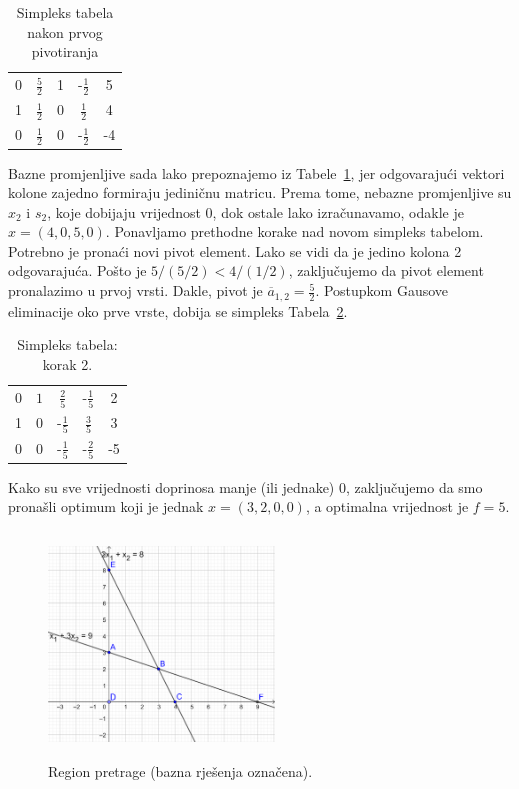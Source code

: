 \documentclass[a4paper, utf8, 11pt, colorlinks]{book}
\theoremstyle{definition}
\begin{document}
  \begin{table}[H]
     \centering
     \begin{tabular}{c c c c | c}
         0 &  $\frac{5}{2}$  & 1 & -$\frac{1}{2} $& 5 \\
         1 &  $\frac{1}{2}$ & 0 & $\frac{1}{2}$ & 4 \\ \hline
         0 &  $\frac{1}{2}$ & 0 & -$\frac{1}{2}$ & -4 \\ \hline
     \end{tabular}
     \caption{Simpleks tabela nakon prvog pivotiranja}
     \label{tab:simpleks_tabela2}
 \end{table}
Bazne promjenljive sada lako prepoznajemo iz Tabele~\ref{tab:simpleks_tabela2}, jer odgovarajući vektori kolone zajedno formiraju jediničnu matricu. Prema tome, 
 nebazne promjenljive su $x_2$ i $s_2$, koje dobijaju vrijednost 0, dok ostale lako izračunavamo, odakle je $ x = (4, 0, 5, 0)$. Ponavljamo prethodne korake nad novom simpleks tabelom. Potrebno je pronaći novi pivot element. Lako se vidi da je jedino kolona 2 odgovarajuća. Pošto je $5 / (5/2) < 4 / (1/2)$, zaključujemo da  pivot element pronalazimo u prvoj vrsti. Dakle, pivot je 
 $\overline{a}_{1,2} = \frac{5}{2}$. Postupkom Gausove eliminacije oko prve vrste, dobija se simpleks Tabela~\ref{tab:simpleks_tabela3}.
 
   \begin{table}[!ht]
     \centering
     \begin{tabular}{c c c c | c}
         0 &  $1$  & $\frac{2}{5}$             &  -$\frac{1}{5} $ & 2 \\
         1 &  0    &      -$\frac{1}{5}$    & $\frac{3}{5}$    & 3 \\ \hline
         0 &  0    &   -$\frac{1}{5}$       &   -$\frac{2}{5}$   & -5 \\ \hline
     \end{tabular}
     \caption{Simpleks tabela: korak 2.}
     \label{tab:simpleks_tabela3}
 \end{table}
 Kako su sve vrijednosti doprinosa manje (ili jednake) 0, zaključujemo da smo pronašli optimum koji je jednak $x = (3, 2, 0, 0)$, a optimalna vrijednost je $f = 5$.
 
 \begin{figure}[!ht]
     \centering
     \includegraphics[width=170pt, height=170pt]{simpleks-region-2.eps}
     \caption{Region pretrage (bazna rješenja označena).}
     \label{fig:simplex_region} 
 \end{figure}
 
\end{document}
